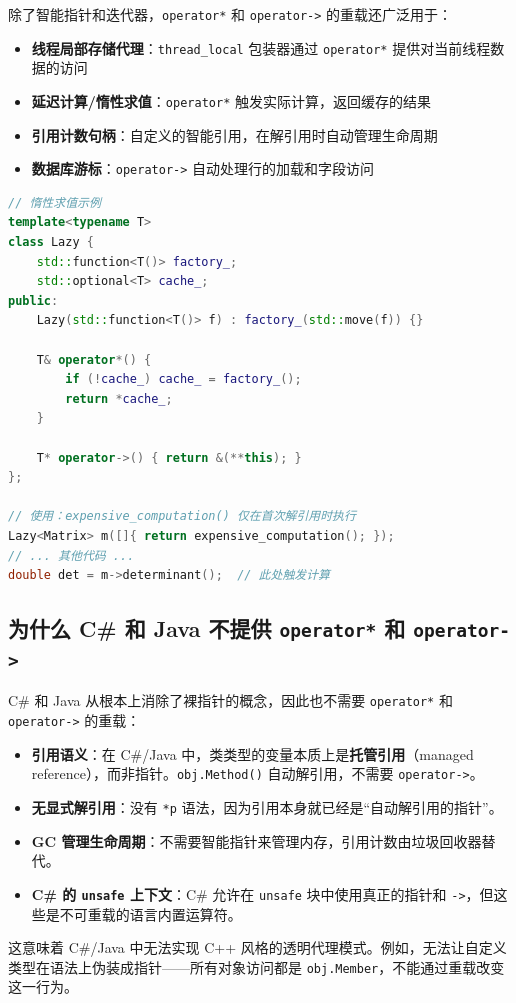 \documentclass[12pt,a4paper,fontset=fandol]{ctexbook}
\newcommand{\cpp}[1]{C++#1}
\newcommand{\Tp}[1]{\texttt{#1}}
\newcommand{\csharp}{C\#}
\newcommand{\Op}[1]{\texttt{operator#1}}
\begin{document}
除了智能指针和迭代器，\Op{*} 和 \Op{->} 的重载还广泛用于：

\begin{itemize}
  \item \textbf{线程局部存储代理}：\Tp{thread\_local} 包装器通过 \Op{*} 提供对当前线程数据的访问
  \item \textbf{延迟计算/惰性求值}：\Op{*} 触发实际计算，返回缓存的结果
  \item \textbf{引用计数句柄}：自定义的智能引用，在解引用时自动管理生命周期
  \item \textbf{数据库游标}：\Op{->} 自动处理行的加载和字段访问
\end{itemize}

\begin{lstlisting}[language=C++]
// 惰性求值示例
template<typename T>
class Lazy {
    std::function<T()> factory_;
    std::optional<T> cache_;
public:
    Lazy(std::function<T()> f) : factory_(std::move(f)) {}

    T& operator*() {
        if (!cache_) cache_ = factory_();
        return *cache_;
    }

    T* operator->() { return &(**this); }
};

// 使用：expensive_computation() 仅在首次解引用时执行
Lazy<Matrix> m([]{ return expensive_computation(); });
// ... 其他代码 ...
double det = m->determinant();  // 此处触发计算
\end{lstlisting}

\subsection{为什么 C\# 和 Java 不提供 \Op{*} 和 \Op{->}}

\begin{compare}[title=C\#/Java 的指针模型]
\csharp{} 和 Java 从根本上消除了裸指针的概念，因此也不需要 \Op{*} 和 \Op{->} 的重载：

\begin{itemize}
  \item \textbf{引用语义}：在 \csharp{}/Java 中，类类型的变量本质上是\textbf{托管引用}（managed reference），而非指针。\texttt{obj.Method()} 自动解引用，不需要 \Op{->}。
  \item \textbf{无显式解引用}：没有 \texttt{*p} 语法，因为引用本身就已经是``自动解引用的指针''。
  \item \textbf{GC 管理生命周期}：不需要智能指针来管理内存，引用计数由垃圾回收器替代。
  \item \textbf{\csharp{} 的 \texttt{unsafe} 上下文}：\csharp{} 允许在 \texttt{unsafe} 块中使用真正的指针和 \texttt{->}，但这些是不可重载的语言内置运算符。
\end{itemize}

这意味着 \csharp{}/Java 中无法实现 \cpp{} 风格的透明代理模式。例如，无法让自定义类型在语法上伪装成指针——所有对象访问都是 \texttt{obj.Member}，不能通过重载改变这一行为。
\end{compare}
\end{document}

